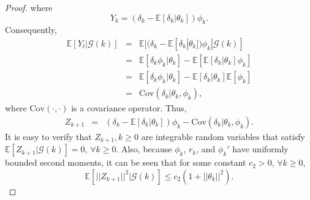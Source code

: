 \begin{proof}
 where
\begin{equation*}
 Y_{k}=(\delta_k-\mathbb{E}[\delta_k|\theta_k])\phi_k.
\end{equation*}
 Consequently,
\begin{equation*}
\begin{array}{ccl}
 \mathbb{E}[Y_t|\mathcal{G}(k)]&=&\mathbb{E}[(\delta_k-\mathbb{E}[\delta_k|\theta_k])\phi_k|\mathcal{G}(k)]\\
&=&\mathbb{E}[\delta_k\phi_k|\theta_k]
 -\mathbb{E}[\mathbb{E}[\delta_k|\theta_k]\phi_k]\\
&=&\mathbb{E}[\delta_k\phi_k|\theta_k]
 -\mathbb{E}[\delta_k|\theta_k]\mathbb{E}[\phi_k]\\
&=&\mathrm{Cov}(\delta_k|\theta_k,\phi_k),
\end{array}
\end{equation*}
 where $\mathrm{Cov}(\cdot,\cdot)$ is a covariance operator.
Thus,
 \begin{equation*}
\begin{array}{ccl}
 Z_{k+1}&=&(\delta_k-\mathbb{E}[\delta_k|\theta_k])\phi_k-\mathrm{Cov}(\delta_k|\theta_k,\phi_k).
\end{array}
\end{equation*}
 It is easy to verify that $Z_{k+1},k\geq0$ are integrable random variables that 
 satisfy $\mathbb{E}[Z_{k+1}|\mathcal{G}(k)]=0$, $\forall k\geq0$.
 Also, because $\phi_k$, $r_k$, and $\phi_k'$ have
 uniformly bounded second moments, it can be seen that for some constant
$c_2>0$, $\forall k\geq0$,
\begin{equation*}
 \mathbb{E}[||Z_{k+1}||^2|\mathcal{G}(k)]\leq
 c_2(1+||\theta_k||^2).
\end{equation*}


\end{proof}

